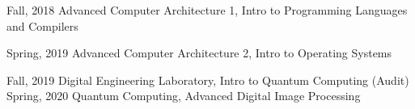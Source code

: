 

\begin{cvskills}

  \cvskill
    {Fall, 2018} %
    {Advanced Computer Architecture 1, Intro to Programming Languages and Compilers} %

  \cvskill
    {Spring, 2019} %
    {Advanced Computer Architecture 2, Intro to Operating Systems} %

  \cvskill
    {Fall, 2019} %
    {Digital Engineering Laboratory, Intro to Quantum Computing (Audit)} %
\cvskill
    {Spring, 2020} %
    {Quantum Computing, Advanced Digital Image Processing} %
\end{cvskills}